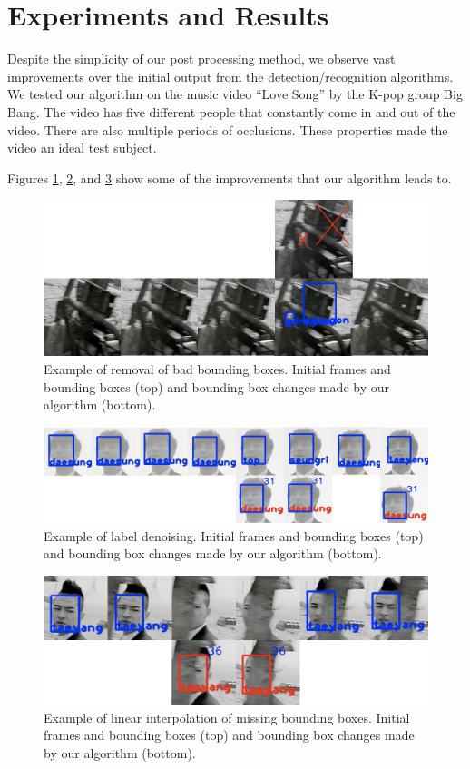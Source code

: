 \documentclass{article}
\begin{document}
\section{Experiments and Results}
Despite the simplicity of our post processing method, we observe vast improvements over the initial output from the detection/recognition algorithms. We tested our algorithm on
the music video ``Love Song'' by the K-pop group Big Bang. The video has five different people that constantly come in and out of the video.
There are also multiple periods of occlusions. These properties made the
video an ideal test subject.

Figures \ref{figure:denoise}, \ref{figure:labels}, and \ref{figure:linear-interpolation} show some of the improvements that our algorithm leads to.

\begin{figure}[!t]
\centering
\includegraphics[width=\linewidth]{denoise.jpg}
\caption{Example of removal of bad bounding boxes. Initial frames and bounding boxes (top) and bounding box changes made by our algorithm (bottom). }
\label{figure:denoise}
\end{figure}

\begin{figure}[!t]
\centering
\includegraphics[width=\linewidth]{labels.jpg}
\caption{Example of label denoising. Initial frames and bounding boxes (top) and bounding box changes made by our algorithm (bottom). }
\label{figure:labels}
\end{figure}

\begin{figure}[!t]
\centering
\includegraphics[width=\linewidth]{linear-interpolation.jpg}
\caption{Example of linear interpolation of missing bounding boxes. Initial frames and bounding boxes (top) and bounding box changes made by our algorithm (bottom). }
\label{figure:linear-interpolation}
\end{figure}
\end{document}
